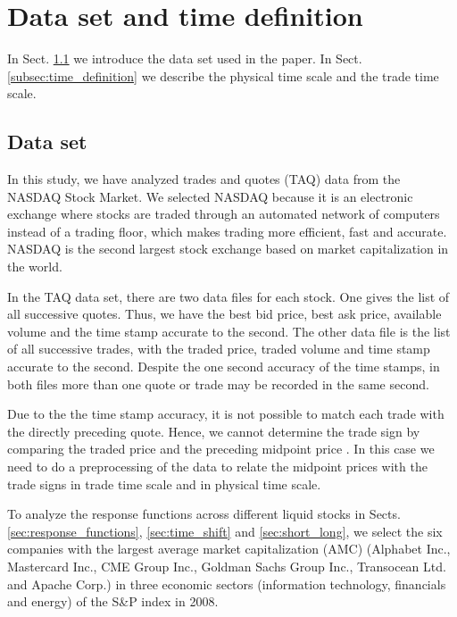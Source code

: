 \section{Data set and time definition}\label{sec:data_time}

In Sect. \ref{subsec:data_set} we introduce the data set used in the paper. In
Sect. \ref{subsec:time_definition} we describe the physical time scale and the
trade time scale.

\subsection{Data set}\label{subsec:data_set}

In this study, we have analyzed trades and quotes (TAQ) data from the NASDAQ
Stock Market. We selected NASDAQ because it is an electronic exchange where
stocks are traded through an automated network of computers instead of a
trading floor, which makes trading more efficient, fast and accurate.
NASDAQ is the second largest stock exchange based on market capitalization in
the world.

In the TAQ data set, there are two data files for each stock. One gives the
list of all successive quotes. Thus, we have the best bid price, best ask
price, available volume and the time stamp accurate to the second. The other
data file is the list of all successive trades, with the traded price, traded
volume and time stamp accurate to the second. Despite the one second accuracy
of the time stamps, in both files more than one quote or trade may be recorded
in the same second.

Due to the the time stamp accuracy, it is not possible to match each trade with
the directly preceding quote. Hence, we cannot determine the trade sign by
comparing the traded price and the preceding midpoint price
\cite{Wang_2016_cross}. In this case we need to do a preprocessing of the data
to relate the midpoint prices with the trade signs in trade time scale and in
physical time scale.

To analyze the response functions across different liquid stocks in Sects.
\ref{sec:response_functions}, \ref{sec:time_shift} and \ref{sec:short_long},
we select the six companies with the largest average market capitalization
(AMC) (Alphabet Inc., Mastercard Inc., CME Group Inc., Goldman Sachs Group
Inc., Transocean Ltd. and Apache Corp.) in three economic sectors (information
technology, financials and energy) of the S\&P index in 2008.


